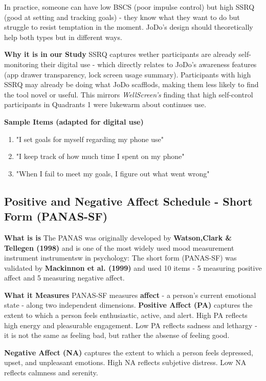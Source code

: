 \documentclass[12pt]{article}
\begin{document}
   
In practice, someone can have low BSCS (poor impulse control) but high SSRQ (good at setting and tracking goals) - they know what they want to do but struggle to resist temptation in the moment. JoDo's design should theoretically help both types but in different ways.

\textbf{Why it is in our Study}
SSRQ captures wether participants are already self-monitoring their digital use - which directly relates to JoDo's awareness features (app drawer transparency, lock screen usage summary). Participants with high SSRQ may already be doing what JoDo scafflods, making them less likely to find the tool novel or useful. This mirrors \textit{WellScreen's} finding that high self-control participants in Quadrants 1 were lukewarm about continues use.

\textbf{Sample Items (adapted for digital use)}
\begin{enumerate}
    \item "I set goals for myself regarding my phone use"
    \item "I keep track of how much time I spent on my phone"
    \item "When I fail to meet my goals, I figure out what went wrong"
\end{enumerate}

\subsection{Positive and Negative Affect Schedule - Short Form (PANAS-SF)}
\textbf{What is is}
The PANAS was originally developed by \textbf{Watson,Clark \& Tellegen (1998)} and is one of the most widely used mood measurement instrument instrumentsw in psychology: The short form (PANAS-SF) was validated  by \textbf{Mackinnon et al. (1999)} and used 10 items - 5 measuring positive affect and 5 measuring negative affect.


\textbf{What it Measures}
PANAS-SF measures \textbf{affect} - a person's current emotional state - along two independent dimensions.
\textbf{Positive Affect (PA)} captures the extent to which a person feels enthusiastic, active, and alert. High PA reflects high energy and pleasurable engagement. Low PA reflects sadness and lethargy - it is not the same as feeling bad, but rather the absense of feeling good.

\textbf{Negative Affect (NA)} captures the extent to which a person feels depressed, upset, and unpleasant emotions. High NA reflects subjetive distress. Low NA reflects calmness and serenity.
\end{document}
